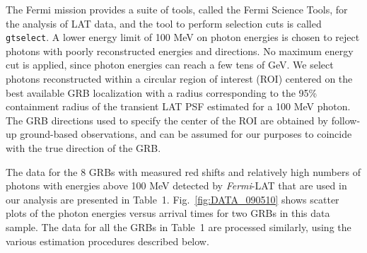 \documentclass[12pt]{article}
\begin{document}
The Fermi mission provides a suite of tools, called the Fermi
Science Tools, for the analysis of LAT data, and the tool to perform selection cuts is called {\tt gtselect}.
A lower energy limit of 100 MeV on photon energies is chosen to reject photons with poorly reconstructed
energies and directions. No maximum energy cut is applied, since photon energies can reach
a few tens of GeV. We select photons reconstructed within a circular region of interest (ROI)
centered on the best available GRB localization with
a radius corresponding to the 95\% containment radius of the transient LAT PSF
estimated for a 100 MeV photon.
The GRB directions used to specify the center of the ROI  are obtained by follow-up ground-based
observations, and can be assumed for our purposes to coincide with the true direction of the GRB.

The data for the 8 GRBs with measured
red shifts and relatively high numbers of photons with
energies above 100 MeV detected by {\it Fermi}-LAT that are used in our analysis are presented in Table~1.
Fig.~\ref{fig:DATA_090510} shows scatter plots of the photon energies versus arrival
times for two GRBs in this data sample. The data for all the GRBs in Table~1 are processed
similarly, using the various estimation procedures
described below.
\end{document}
